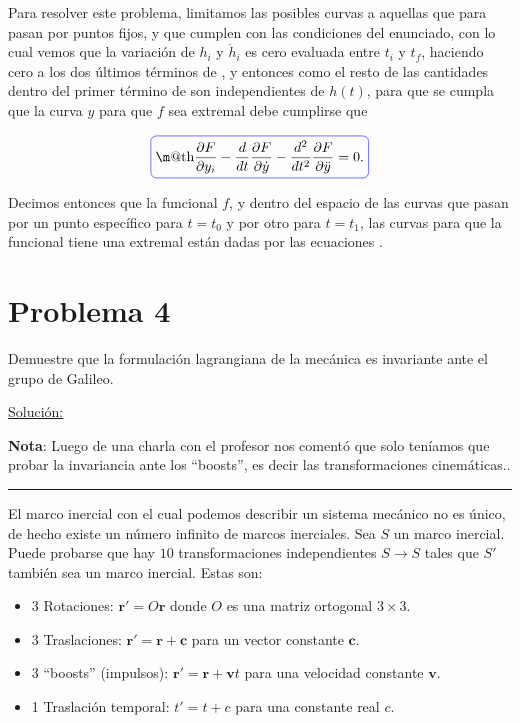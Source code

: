 \documentclass[a4paper,10pt]{article}
\makeatletter
\numberwithin{equation}{section}
\newcommand*{\boxcolor}{blue}
\renewcommand{\boxed}[1]{\textcolor{\boxcolor}{%
\tikz[baseline={([yshift=-1ex]current bounding box.center)}] \node [rectangle, minimum width=1ex,rounded corners,draw] {\normalcolor\m@th$\displaystyle#1$};}}
\makeatother
\begin{document}
Para resolver este problema, limitamos las posibles curvas a aquellas que 
para pasan por puntos fijos, y que cumplen con las condiciones del enunciado, con lo 
cual vemos que la variación de $h_i$ y $\dot{h}_i$ es cero evaluada entre $t_i$ y $t_f$, 
haciendo cero a los dos últimos términos de , y entonces 
como el resto de las cantidades dentro del primer término de 
son independientes de $h(t)$, para que se cumpla que la curva $y$ para que $f$ sea 
extremal debe cumplirse que 

\begin{equation}
\boxed{\frac{\partial F}{\partial y_i}  - 
 \frac{d}{dt}\frac{\partial F}{\partial \dot{y}}  
 - \frac{d^2}{dt^2}\frac{\partial F}{\partial \ddot{y}} = 0.}
 \label{eq:condicionExtremal}
\end{equation}

Decimos entonces que la funcional $f$, y dentro del espacio de las curvas que pasan 
por un punto específico para $t=t_0$ y por otro para $t=t_1$, las curvas para que la 
funcional tiene una extremal están dadas por las ecuaciones .



\section{Problema 4}

Demuestre que la formulación lagrangiana de la mecánica es invariante ante el grupo 
de Galileo.

\vspace{.3cm}

\underline{Solución:} \vspace{.3cm}

\textbf{Nota}: Luego de una charla con el profesor nos comentó que solo teníamos que probar 
la invariancia ante los ``boosts'', es decir las transformaciones cinemáticas..

\noindent\rule[0.5ex]{\linewidth}{1pt}

El marco inercial con el cual podemos describir un sistema mecánico no es único, de hecho 
existe un número infinito de marcos inerciales. Sea $S$ un marco inercial. Puede probarse 
\cite{tong} que hay $10$ transformaciones independientes $S\rightarrow S$ tales que 
$S'$ también sea un marco inercial. Estas son:

\begin{itemize}
 \item 3 Rotaciones: $\mathbf{r}' = O\mathbf{r}$ donde $O$ es una matriz ortogonal $3\times 3$.
 \item 3 Traslaciones: $\mathbf{r}' = \mathbf{r} + \mathbf{c}$ para un vector constante $\mathbf{c}$.
 \item 3 ``boosts'' (impulsos): $\mathbf{r}' = \mathbf{r} + \mathbf{v}t$ para una velocidad constante 
 $\mathbf{v}$.
 \item 1 Traslación temporal: $t' = t+c$ para una constante real $c$.
\end{itemize}
\end{document}
